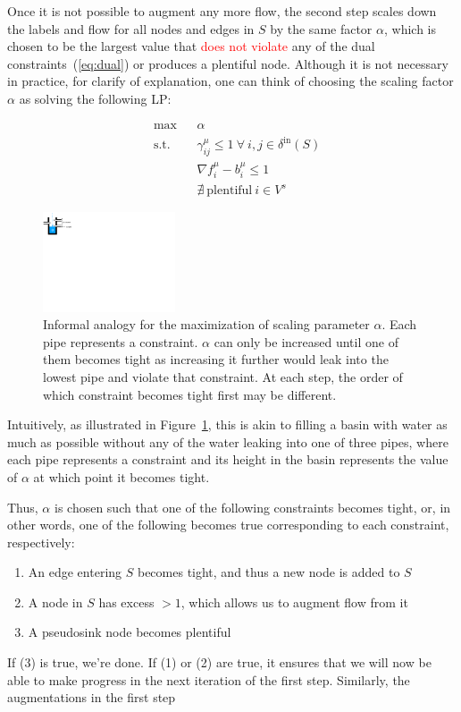 \documentclass[12pt]{article}
\theoremstyle{definition}
\newcommand{\fu}{f^{\mu}}
\newcommand{\nfiu}{\nabla \fu_i}
\newcommand{\biu}{b_{i}^{\mu}}
\newcommand{\din}{\delta^{\text{in}}}
\newcommand{\vsink}{V^{s}}
\newcommand{\rewrite}[1]{\textcolor{red}{#1}}
\newcommand{\lpeq}[1] {
\begin{equation*}
\begin{aligned}
#1
\end{aligned}
\end{equation*}
}
\newcommand{\lpone}[3] {
& \underset{}{\text{#1}}
&& #2 \\
& \text{s.t.}
&& #3 
}
\newcommand{\lptwo}[4] {
\lpone{#1}{#2}{#3}\\
&&& #4
}
\newcommand{\lpthree}[5] {
\lptwo{#1}{#2}{#3}{#4}\\
&&& #5
}
\begin{document}
Once it is not possible to augment any more flow, the second step scales down
the labels and flow for all nodes and edges in $S$ by the same factor $\alpha$,
which is chosen to be the largest value that \rewrite{does not violate} any of the dual
constraints~(\ref{eq:dual}) or produces a plentiful node. 
Although it is not necessary in practice, for clarify of explanation, one can think of choosing the scaling factor $\alpha$ as solving
the following LP:
\lpeq{\lpthree{max}
{\alpha}
{\gamma_{ij}^{\mu} \le 1\ \forall\ i,j \in \din(S)}
{\nfiu - \biu \le 1}
{\nexists\ \text{plentiful}\ i \in \vsink}
}
\begin{figure}[b!]
\centering
\includegraphics[width=0.35\textwidth]{figs/water.pdf}
\caption{
\label{fig:alpha}
Informal analogy for the maximization of scaling parameter $\alpha$.
Each pipe represents a constraint. $\alpha$ can only be increased until
one of them becomes tight as increasing it further would leak into
the lowest pipe and violate that constraint.
At each step, the order of which constraint becomes tight first may be different.
}
\end{figure}
Intuitively, as illustrated in Figure~\ref{fig:alpha}, this is akin to filling
a basin with water as much as possible without any of the water leaking into one
of three pipes, where each pipe represents a constraint and its height in the basin
represents the value of $\alpha$ at which point it becomes tight.

Thus, $\alpha$ is chosen such that one of the following constraints becomes
tight, or, in other words, one of the following becomes true corresponding to
each constraint, respectively:
\begin{enumerate}[itemsep=-1mm]
	\item An edge entering $S$ becomes tight, and thus a new node is added to $S$
	\item A node in $S$ has excess $>1$, which allows us to augment flow from it
	\item A pseudosink node becomes plentiful
\end{enumerate}

If (3) is true, we're done. If (1) or (2) are true, it ensures that we will now
be able to make progress in the next iteration of the first step. Similarly, the
augmentations in the first step
\end{document}
